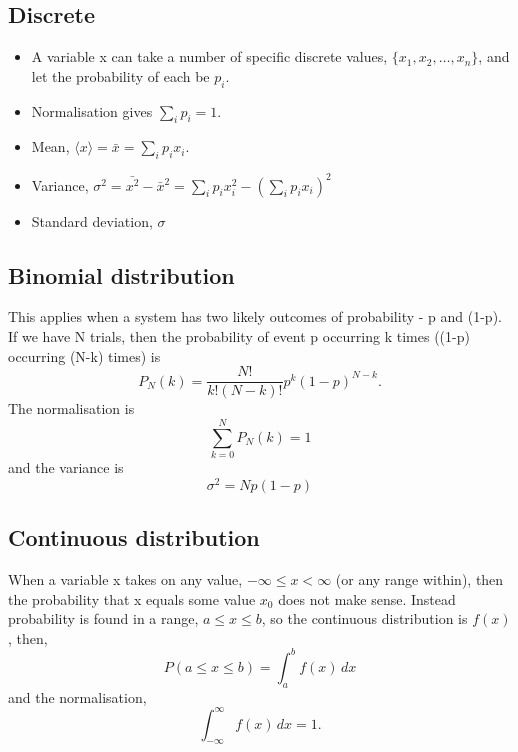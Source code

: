 \documentclass[a4paper, 11pt, normalem]{report}
\begin{document}
\subsection{Discrete}
\begin{itemize}
    \item A variable x can take a number of specific discrete values, $\{x_1, x_2, \dots, x_n\}$, and let the probability of each be $p_i$.
    \item Normalisation gives $\sum_i p_i = 1$.
    \item Mean, $\langle x\rangle = \bar{x} = \sum_i p_ix_i$.
    \item Variance, $\sigma^2 = \bar{x^2} - \bar{x}^2 = \sum_i p_ix_i^2 - \left(\sum_i p_ix_i\right)^2$
    \item Standard deviation, $\sigma$
\end{itemize}

\subsection{Binomial distribution}
This applies when a system has two likely outcomes of probability - p and (1-p).
If we have N trials, then the probability of event p occurring k times ((1-p) occurring (N-k) times) is
\begin{equation}
    P_N(k) = \frac{N!}{k!(N-k)!}p^k(1-p)^{N-k}.
\end{equation}
The normalisation is
\begin{equation}
    \sum_{k=0}^{N} P_N(k) = 1
\end{equation}
and the variance is
\begin{equation}
    \sigma^2 = Np(1-p)
\end{equation}

\subsection{Continuous distribution}
When a variable x takes on any value, $-\infty\leq x <\infty$ (or any range within), then the probability that x equals some value $x_0$ does not make sense. 
Instead probability is found in a range, $a\leq x\leq b$, so the continuous distribution is $f(x)$, then,
\begin{equation}
    P(a\leq x\leq b) = \int_{a}^{b} f(x)\,dx
\end{equation}
and the normalisation, 
\begin{equation}
    \int_{-\infty}^{\infty} f(x)\,dx = 1.
\end{equation}
\end{document}
